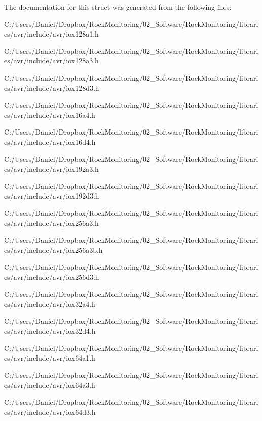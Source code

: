 The documentation for this struct was generated from the following files\+:\begin{DoxyCompactItemize}
\item 
C\+:/\+Users/\+Daniel/\+Dropbox/\+Rock\+Monitoring/02\+\_\+\+Software/\+Rock\+Monitoring/libraries/avr/include/avr/iox128a1.\+h\item 
C\+:/\+Users/\+Daniel/\+Dropbox/\+Rock\+Monitoring/02\+\_\+\+Software/\+Rock\+Monitoring/libraries/avr/include/avr/iox128a3.\+h\item 
C\+:/\+Users/\+Daniel/\+Dropbox/\+Rock\+Monitoring/02\+\_\+\+Software/\+Rock\+Monitoring/libraries/avr/include/avr/iox128d3.\+h\item 
C\+:/\+Users/\+Daniel/\+Dropbox/\+Rock\+Monitoring/02\+\_\+\+Software/\+Rock\+Monitoring/libraries/avr/include/avr/iox16a4.\+h\item 
C\+:/\+Users/\+Daniel/\+Dropbox/\+Rock\+Monitoring/02\+\_\+\+Software/\+Rock\+Monitoring/libraries/avr/include/avr/iox16d4.\+h\item 
C\+:/\+Users/\+Daniel/\+Dropbox/\+Rock\+Monitoring/02\+\_\+\+Software/\+Rock\+Monitoring/libraries/avr/include/avr/iox192a3.\+h\item 
C\+:/\+Users/\+Daniel/\+Dropbox/\+Rock\+Monitoring/02\+\_\+\+Software/\+Rock\+Monitoring/libraries/avr/include/avr/iox192d3.\+h\item 
C\+:/\+Users/\+Daniel/\+Dropbox/\+Rock\+Monitoring/02\+\_\+\+Software/\+Rock\+Monitoring/libraries/avr/include/avr/iox256a3.\+h\item 
C\+:/\+Users/\+Daniel/\+Dropbox/\+Rock\+Monitoring/02\+\_\+\+Software/\+Rock\+Monitoring/libraries/avr/include/avr/iox256a3b.\+h\item 
C\+:/\+Users/\+Daniel/\+Dropbox/\+Rock\+Monitoring/02\+\_\+\+Software/\+Rock\+Monitoring/libraries/avr/include/avr/iox256d3.\+h\item 
C\+:/\+Users/\+Daniel/\+Dropbox/\+Rock\+Monitoring/02\+\_\+\+Software/\+Rock\+Monitoring/libraries/avr/include/avr/iox32a4.\+h\item 
C\+:/\+Users/\+Daniel/\+Dropbox/\+Rock\+Monitoring/02\+\_\+\+Software/\+Rock\+Monitoring/libraries/avr/include/avr/iox32d4.\+h\item 
C\+:/\+Users/\+Daniel/\+Dropbox/\+Rock\+Monitoring/02\+\_\+\+Software/\+Rock\+Monitoring/libraries/avr/include/avr/iox64a1.\+h\item 
C\+:/\+Users/\+Daniel/\+Dropbox/\+Rock\+Monitoring/02\+\_\+\+Software/\+Rock\+Monitoring/libraries/avr/include/avr/iox64a3.\+h\item 
C\+:/\+Users/\+Daniel/\+Dropbox/\+Rock\+Monitoring/02\+\_\+\+Software/\+Rock\+Monitoring/libraries/avr/include/avr/iox64d3.\+h\end{DoxyCompactItemize}
